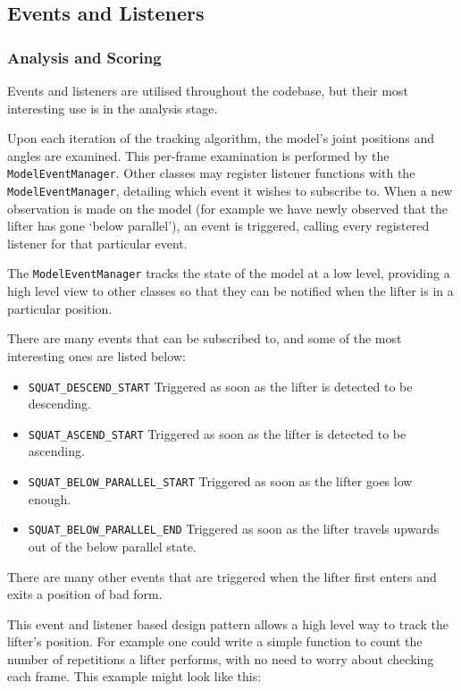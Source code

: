 \subsection{Events and Listeners}
\label{sec:listeners}

\subsubsection{Analysis and Scoring}

Events and listeners are utilised throughout the codebase, but their most interesting use is in the analysis stage.

Upon each iteration of the tracking algorithm, the model's joint positions and angles are examined. This per-frame examination is performed by the \texttt{ModelEventManager}. Other classes may register listener functions with the \texttt{ModelEventManager}, detailing which event it wishes to subscribe to. When a new observation is made on the model (for example we have newly observed that the lifter has gone `below parallel'), an event is triggered, calling every registered listener for that particular event.

The \texttt{ModelEventManager} tracks the state of the model at a low level, providing a high level view to other classes so that they can be notified when the lifter is in a particular position.

There are many events that can be subscribed to, and some of the most interesting ones are listed below:

\begin{itemize}
	\item \texttt{SQUAT\_DESCEND\_START} Triggered as soon as the lifter is detected to be descending.
	\item \texttt{SQUAT\_ASCEND\_START} Triggered as soon as the lifter is detected to be ascending.
	\item \texttt{SQUAT\_BELOW\_PARALLEL\_START} Triggered as soon as the lifter goes low enough.
	\item \texttt{SQUAT\_BELOW\_PARALLEL\_END} Triggered as soon as the lifter travels upwards out of the below parallel state.
\end{itemize}

There are many other events that are triggered when the lifter first enters and exits a position of bad form.

This event and listener based design pattern allows a high level way to track the lifter's position. For example one could write a simple function to count the number of repetitions a lifter performs, with no need to worry about checking each frame. This example might look like this:

